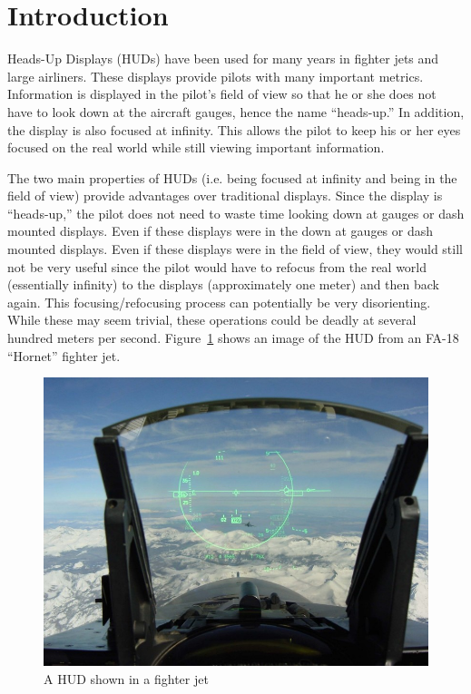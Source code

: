 \section{Introduction}

Heads-Up Displays (HUDs) have been used for many years in fighter jets and
large airliners. These displays provide pilots with many important metrics.
Information is displayed in the pilot's field of view so that he or she
does not have to look down at the aircraft gauges, hence the name
``heads-up.'' In addition, the display is also focused at infinity. This
allows the pilot to keep his or her eyes focused on the real world while
still viewing important information.

The two main properties of HUDs (i.e. being focused at infinity and being
in the field of view) provide advantages over traditional displays. Since
the display is ``heads-up,'' the pilot does not need to waste time looking
down at gauges or dash mounted displays. Even if these displays were in the
down at gauges or dash mounted displays. Even if these displays were in the
field of view, they would still not be very useful since the pilot would
have to refocus from the real world (essentially infinity) to the displays
(approximately one meter) and then back again. This focusing/refocusing
process can potentially be very disorienting. While these may seem trivial,
these operations could be deadly at several hundred meters per second.
Figure~\ref{fig:jetHUD} shows an image of the HUD from an FA-18 ``Hornet''
fighter jet.

\begin{figure}
\includegraphics[width=\textwidth]{img/JetHUD.jpg}
\caption{A HUD shown in a fighter jet}
\label{fig:jetHUD}
\end{figure}


